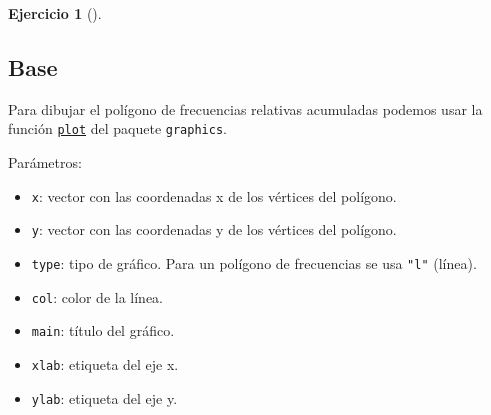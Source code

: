 \documentclass[
  a4paper,
]{scrreport}
\newenvironment{Shaded}{\begin{snugshade}}{\end{snugshade}}
\newcommand{\AttributeTok}[1]{\textcolor[rgb]{0.40,0.45,0.13}{#1}}
\newcommand{\CommentTok}[1]{\textcolor[rgb]{0.37,0.37,0.37}{#1}}
\newcommand{\DecValTok}[1]{\textcolor[rgb]{0.68,0.00,0.00}{#1}}
\newcommand{\FunctionTok}[1]{\textcolor[rgb]{0.28,0.35,0.67}{#1}}
\newcommand{\NormalTok}[1]{\textcolor[rgb]{0.00,0.23,0.31}{#1}}
\newcommand{\OtherTok}[1]{\textcolor[rgb]{0.00,0.23,0.31}{#1}}
\newcommand{\SpecialCharTok}[1]{\textcolor[rgb]{0.37,0.37,0.37}{#1}}
\newcommand{\StringTok}[1]{\textcolor[rgb]{0.13,0.47,0.30}{#1}}
\providecommand{\tightlist}{%
  \setlength{\itemsep}{0pt}\setlength{\parskip}{0pt}}\usepackage{longtable,booktabs,array}
\theoremstyle{definition}
\newtheorem{exercise}{Ejercicio}[chapter]
\theoremstyle{remark}
\begin{document}
\begin{exercise}[]
\begin{enumerate}
\begin{tcolorbox}
  \section{Base}

  Para dibujar el polígono de frecuencias relativas acumuladas podemos
  usar la función
  \href{https://www.rdocumentation.org/packages/graphics/versions/3.6.2/topics/plot}{\texttt{plot}}
  del paquete \texttt{graphics}.

  Parámetros:

  \begin{itemize}
  \tightlist
  \item
    \texttt{x}: vector con las coordenadas x de los vértices del
    polígono.
  \item
    \texttt{y}: vector con las coordenadas y de los vértices del
    polígono.
  \item
    \texttt{type}: tipo de gráfico. Para un polígono de frecuencias se
    usa \texttt{"l"} (línea).
  \item
    \texttt{col}: color de la línea.
  \item
    \texttt{main}: título del gráfico.
  \item
    \texttt{xlab}: etiqueta del eje x.
  \item
    \texttt{ylab}: etiqueta del eje y.
  \end{itemize}

\begin{Shaded}
\end{Shaded}


\end{tcolorbox}
\end{enumerate}
\end{exercise}
\end{document}
